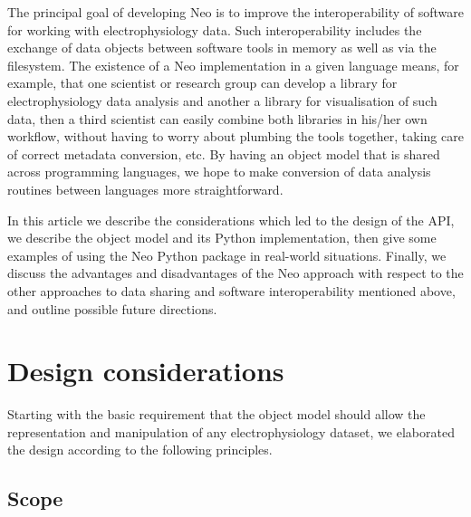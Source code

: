 \documentclass{frontiers}
\begin{document}
The principal goal of developing Neo is to improve the interoperability of software for working with electrophysiology data. Such interoperability includes the exchange of data objects between software tools in memory as well as via the filesystem. The existence of a Neo implementation in a given language means, for example, that one scientist or research group can develop a library for electrophysiology data analysis and another a library for visualisation of such data, then a third scientist can easily combine both libraries in his/her own workflow, without having to worry about plumbing the tools together, taking care of correct metadata conversion, etc. By having an object model that is shared across programming languages, we hope to make conversion of data analysis routines between languages more straightforward.

In this article we describe the considerations which led to the design of the API, we describe the object model and its Python implementation, then give some examples of using the Neo Python package in real-world situations. Finally, we discuss the advantages and disadvantages of the Neo approach with respect to the other approaches to data sharing and software interoperability mentioned above, and outline possible future directions.


\section{Design considerations}


Starting with the basic requirement that the object model should allow the representation and manipulation of any electrophysiology dataset, we elaborated the design according to the following principles. 

\subsection{Scope}
\end{document}
